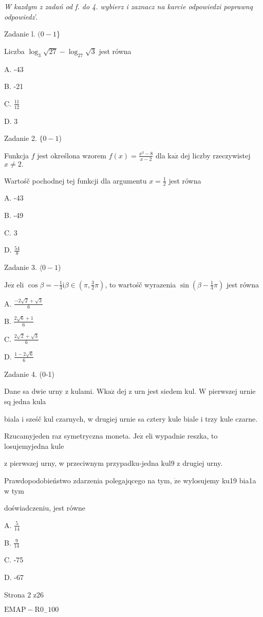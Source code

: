 \documentclass[a4paper,12pt]{article}
\begin{document}
{\it W kazdym z zadań od f. do 4. wybierz i zaznacz na karcie odpowiedzi poprawnq odpowiedz}'.

Zadanie l. $(0-1$\}

Liczba $\log_{3}\sqrt{27}-\log_{27}\sqrt{3}$ jest równa

A. -43

B. -21

C. $\displaystyle \frac{11}{12}$

D. 3

Zadanie 2. $\{0-1$)

Funkcja $f$ jest określona wzorem $f(x)=\displaystyle \frac{x^{3}-8}{x-2}$ dla $\mathrm{k}\mathrm{a}\dot{\mathrm{z}}$ dej liczby rzeczywistej $x\neq 2.$

Wartośč pochodnej tej funkcji dla argumentu $x=\displaystyle \frac{1}{2}$ jest równa

A. -43

B. -49

C. 3

D. $\displaystyle \frac{54}{8}$

Zadanie 3. $\langle 0-1$)

$\mathrm{J}\mathrm{e}\dot{\mathrm{z}}$ eli $\displaystyle \cos\beta=-\frac{1}{3} \mathrm{i} \displaystyle \beta\in(\pi,\frac{3}{2}\pi)$, to wartośč wyrazenia $\displaystyle \sin(\beta-\frac{1}{3}\pi)$ jest równa

A. $\displaystyle \frac{-2\sqrt{2}+\sqrt{3}}{6}$

B. $\displaystyle \frac{2\sqrt{6}+1}{6}$

C. $\displaystyle \frac{2\sqrt{2}+\sqrt{3}}{6}$

D. $\displaystyle \frac{1-2\sqrt{6}}{6}$

Zadanie 4. (0-1)

Dane sa dwie urny z kulami. $\mathrm{W}\mathrm{k}\mathrm{a}\dot{\mathrm{z}}$ dej z urn jest siedem kul. $\mathrm{W}$ pierwszej urnie sq jedna kula

biala i sześč kul czarnych, w drugiej urnie sa cztery kule biale i trzy kule czarne.

Rzucamyjeden raz symetryczna moneta. $\mathrm{J}\mathrm{e}\dot{\mathrm{z}}$ eli wypadnie reszka, to losujemyjedna kule

z pierwszej urny, w przeciwnym przypadku-jedna $\mathrm{k}\mathrm{u}\mathrm{l}9$ z drugiej urny.

Prawdopodobieństwo zdarzenia polegajqcego na tym, $\dot{\mathrm{z}}\mathrm{e}$ wylosujemy ku19 bia1a w tym

doświadczeniu, jest równe

A. $\displaystyle \frac{5}{14}$

B. $\displaystyle \frac{9}{14}$

C. -75

D. -67

Strona 2 z26

$\mathrm{E}\mathrm{M}\mathrm{A}\mathrm{P}-\mathrm{R}0_{-}100$
\end{document}
